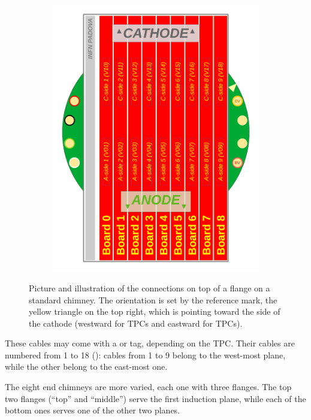 \begin{figure}
\begin{subfigure}{0.55\linewidth}
    \includegraphics[width=\textwidth]{figures/TopFlangesAndMinicrate}
  \end{subfigure}
  \caption{
    Picture and illustration of the connections on top of a flange on a standard chimney.
    The orientation is set by the reference mark,
    the yellow triangle on the top right,
    which is pointing toward the side of the cathode
    (\ie westward for  TPCs and eastward for  TPCs).
  }
  \label{fig:FlangeStandard}
\end{figure}

These cables may come with a  or  tag, depending on the TPC.
Their cables are numbered from 1 to 18 (\eg {}):
cables from 1 to 9 belong to the west-most plane, while the other belong to the east-most one.

The eight end chimneys are more varied, each one with three flanges.
The top two flanges (``top'' and ``middle'') serve the first induction plane,
while each of the bottom ones serves one of the other two planes.

